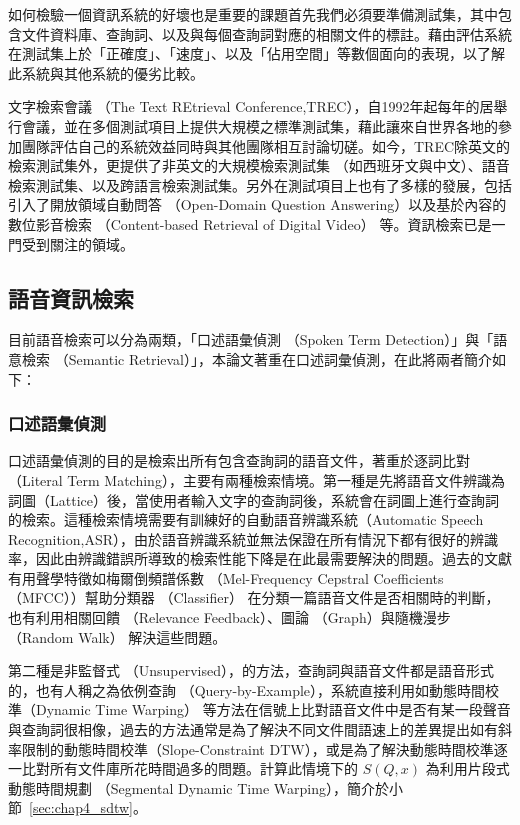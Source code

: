 如何檢驗一個資訊系統的好壞也是重要的課題首先我們必須要準備測試集，其中包含文件資料庫、查詢詞、以及與每個查詢詞對應的相關文件的標註。藉由評估系統在測試集上於「正確度」、「速度」、以及「佔用空間」等數個面向的表現，以了解此系統與其他系統的優劣比較。

文字檢索會議 （The Text REtrieval Conference,TREC），自1992年起每年的居舉行會議，並在多個測試項目上提供大規模之標準測試集，藉此讓來自世界各地的參加團隊評估自己的系統效益同時與其他團隊相互討論切磋。如今，TREC除英文的檢索測試集外，更提供了非英文的大規模檢索測試集
（如西班牙文與中文）、語音檢索測試集、以及跨語言檢索測試集。另外在測試項目上也有了多樣的發展，包括引入了開放領域自動問答
（Open-Domain Question Answering）以及基於內容的數位影音檢索
（Content-based Retrieval of Digital Video）
等。資訊檢索已是一門受到關注的領域。



\subsection{語音資訊檢索}
目前語音檢索可以分為兩類，「口述語彙偵測 （Spoken Term
Detection）」與「語意檢索 （Semantic
Retrieval）」，本論文著重在口述詞彙偵測，在此將兩者簡介如下：

\subsubsection{口述語彙偵測}


口述語彙偵測的目的是檢索出所有包含查詢詞的語音文件，著重於逐詞比對（Literal
Term
Matching），主要有兩種檢索情境。第一種是先將語音文件辨識為詞圖（Lattice）後，當使用者輸入文字的查詢詞後，系統會在詞圖上進行查詢詞的檢索。這種檢索情境需要有訓練好的自動語音辨識系統（Automatic Speech Recognition,ASR），由於語音辨識系統並無法保證在所有情況下都有很好的辨識率，因此由辨識錯誤所導致的檢索性能下降是在此最需要解決的問題。過去的文獻有用聲學特徵如梅爾倒頻譜係數
（Mel-Frequency Cepstral Coefficients （MFCC））幫助分類器 （Classifier）
在分類一篇語音文件是否相關時的判斷，也有利用相關回饋 （Relevance Feedback）、圖論 （Graph）與隨機漫步 （Random Walk）
解決這些問題。

第二種是非監督式
（Unsupervised），的方法，查詢詞與語音文件都是語音形式的，也有人稱之為依例查詢
（Query-by-Example），系統直接利用如動態時間校準（Dynamic Time Warping）
等方法在信號上比對語音文件中是否有某一段聲音與查詢詞很相像，過去的方法通常是為了解決不同文件間語速上的差異提出如有斜率限制的動態時間校準（Slope-Constraint
DTW），或是為了解決動態時間校準逐一比對所有文件庫所花時間過多的問題。計算此情境下的
 $ S(Q, x) $  為利用片段式動態時間規劃 （Segmental Dynamic Time
 Warping），簡介於小節~\ref{sec:chap4_sdtw}。

